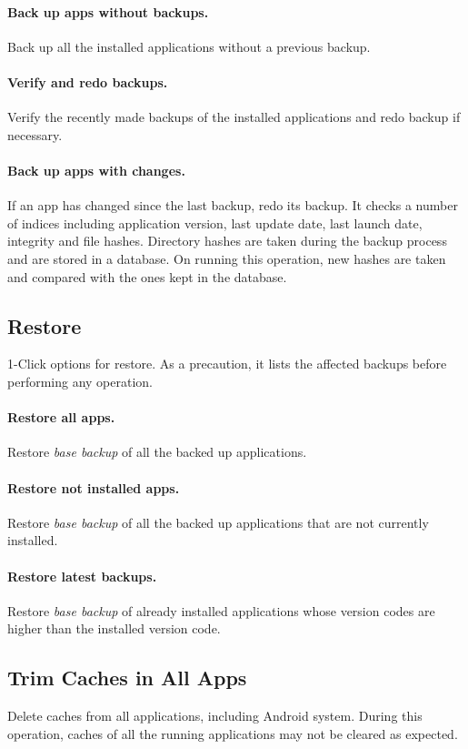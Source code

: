 \paragraph{Back up apps without backups.} Back up all the installed applications without a previous backup.

\paragraph{Verify and redo backups.} Verify the recently made backups of the installed applications and redo backup if necessary.

\paragraph{Back up apps with changes.} If an app has changed since the last backup, redo its backup.
It checks a number of indices including application version, last update date, last launch date, integrity and file hashes.
Directory hashes are taken during the backup process and are stored in a database.
On running this operation, new hashes are taken and compared with the ones kept in the database.

\subsection{Restore}\label{subsec:1-click-restore} %
1-Click options for restore. As a precaution, it lists the affected backups before performing any operation.

\paragraph{Restore all apps.} Restore \textit{base backup} of all the backed up applications.

\paragraph{Restore not installed apps.} Restore \textit{base backup} of all the backed up applications that are not currently installed.

\paragraph{Restore latest backups.} Restore \textit{base backup} of already installed applications whose version codes are higher than the installed version code.

\subsection{Trim Caches in All Apps}\label{subsec:trim-caches-in-all-apps} %
Delete caches from all applications, including Android system. During this operation, caches of all the running
applications may not be cleared as expected.
